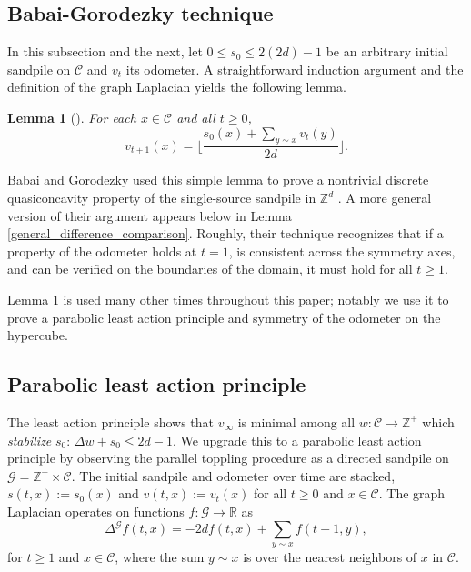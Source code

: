 \documentclass[12pt]{amsart}
\newtheorem{lemma}[theorem]{Lemma}
\newcommand{\Z}{\mathbb{Z}}
\begin{document}
	
	\subsection{Babai-Gorodezky technique} 
	In this subsection and the next, let $0 \leq s_0 \leq 2 (2 d) - 1$ be an arbitrary initial sandpile on $\mathcal{C}$ and $v_t$ its odometer. A straightforward induction argument and the definition of the graph Laplacian yields the following lemma. 
	\begin{lemma}[] \label{pt_ind_lemma}
		For each $x \in \mathcal{C}$ and all $t \geq 0$, 
		\begin{equation}
		v_{t+1}(x) =   \lfloor \frac{ s_0(x) + \sum_{y \sim x} v_{t}(y) }{2 d} \rfloor.
		\end{equation}
	\end{lemma}
	Babai and Gorodezky used this simple lemma to prove a nontrivial discrete quasiconcavity property of the single-source sandpile in $\Z^d$ \cite{babai2007sandpile}. A more general version of their argument appears below in Lemma \ref{general_difference_comparison}. Roughly, their technique recognizes that if a property of the odometer holds at $t=1$, is consistent across the symmetry axes, and can be verified on the boundaries of the domain, it must hold for all $t \geq 1$.
	
	Lemma \ref{pt_ind_lemma} is used many other times throughout this paper; notably we use it to prove a parabolic least action principle and symmetry of the odometer on the hypercube. 
	
	
	\subsection{Parabolic least action principle} 
	The least action principle \cite{fey2010growth} shows that $v_\infty$ is minimal among all $w: \mathcal{C} \to \mathbb{Z}^+$ which {\it stabilize} $s_0$: $\Delta w + s_0 \leq 2d -1$. We upgrade this to a parabolic least action principle by observing the parallel toppling procedure as a directed sandpile on $\mathcal{G} = \mathbb{Z}^+ \times \mathcal{C}$. The initial sandpile and odometer over time are stacked,
	$s(t,x) := s_0(x)$ and $v(t,x) := v_t(x)$ for all $t \geq 0$ and $x \in \mathcal{C}$.  The graph Laplacian operates on functions $f:\mathcal{G} \to \mathbb{R}$ as
	\begin{equation}
	\Delta^{\mathcal{G}} f(t,x) = -2 d f(t,x) + \sum_{y \sim x} f(t-1,y),
	\end{equation}
	for $t \geq 1$ and $x \in \mathcal{C}$, where the sum $y \sim x$ is over the nearest neighbors of $x$ in $\mathcal{C}$.
\end{document}
